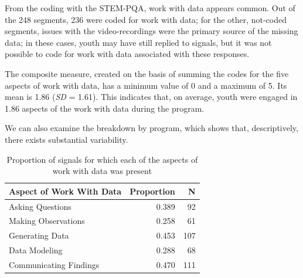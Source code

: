 \documentclass[]{msu-thesis}
\theoremstyle{definition}
\theoremstyle{definition}
\theoremstyle{definition}
\theoremstyle{remark}
\begin{document}
From the coding with the STEM-PQA, work with data appears common. Out of
the 248 segments, 236 were coded for work with data; for the other,
not-coded segments, issues with the video-recordings were the primary
source of the missing data; in these cases, youth may have still replied
to signals, but it was not possible to code for work with data
associated with these responses.

The composite measure, created on the basis of summing the codes for the
five aspects of work with data, has a minimum value of 0 and a maximum
of 5. Its mean is 1.86 (\emph{SD} = 1.61). This indicates that, on
average, youth were engaged in 1.86 aspects of the work with data during
the program.

We can also examine the breakdown by program, which shows that,
descriptively, there exists substantial variability.

\begin{table}

\caption{\label{tab:unnamed-chunk-9}Proportion of signals for which each of the aspects of work with data was present}
\centering
\begin{tabular}[t]{lrr}
\toprule
Aspect of Work With Data & Proportion & N\\
\midrule
Asking Questions & 0.389 & 92\\
Making Observations & 0.258 & 61\\
Generating Data & 0.453 & 107\\
Data Modeling & 0.288 & 68\\
Communicating Findings & 0.470 & 111\\
\bottomrule
\end{tabular}
\end{table}
\end{document}
